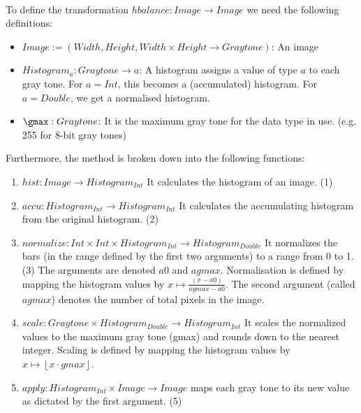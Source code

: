       \paragraph{}
      To define the transformation $ hbalance: Image \rightarrow Image$ we need the following definitions:
      \begin{itemize}
        \item $Image := (Width,Height,Width \times Height \rightarrow Graytone)$:
          An image
        \item $Histogram_a: Graytone \rightarrow a$:
          A histogram  assigns a value of type $a$ to each gray tone. For $a = Int$,
          this becomes a (accumulated) histogram. For $a = Double$, we get
          a normalised histogram.
        \item $\gmax: Graytone$:
          It is the maximum gray tone for the data type in use. (e.g. 255 for 8-bit gray tones)
      \end{itemize}
      
      Furthermore, the method is broken down into the following functions:
      
      \begin{enumerate}
        \item $hist: Image \rightarrow Histogram_{Int}$
          It calculates the histogram of an image. (1)
        \item $accu: Histogram_{Int} \rightarrow Histogram_{Int}$
          It calculates the accumulating histogram from the original histogram. (2)
        \item $normalize: Int \times Int \times Histogram_{Int} \rightarrow Histogram_{Double}$
          It normalizes the bars (in the range defined by the first two arguments) to a range from 0 to 1. (3)
          The arguments are denoted $a0$ and $agmax$.
          Normalisation is defined by mapping the histogram values by $x \mapsto \frac{(x - a0)}{agmax - a0}$.
          The second argument (called $agmax$) denotes the number of total pixels in the image.
        \item $scale: Graytone \times Histogram_{Double} \rightarrow Histogram_{Int}$
          It scales the normalized values to the maximum gray tone (gmax) and rounds down to the nearest integer.
          Scaling is defined by mapping the histogram values by $x \mapsto \left \lfloor{x \cdot gmax}\right \rfloor $.
        \item $apply: Histogram_{Int} \times Image \rightarrow Image$
          maps each gray tone to its new value as dictated by the first argument. (5)
      \end{enumerate}
      
